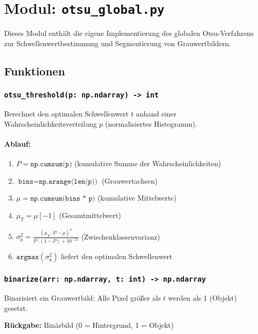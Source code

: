 \documentclass[a4paper,12pt]{article}
\begin{document}
\section{Modul: \texttt{otsu\_global.py}}

Dieses Modul enthält die eigene Implementierung des globalen Otsu-Verfahrens zur Schwellenwertbestimmung und Segmentierung von Grauwertbildern.


\subsection*{Funktionen}

\subsubsection*{\texttt{otsu\_threshold(p: np.ndarray) -> int}}

Berechnet den optimalen Schwellenwert $t$ anhand einer Wahrscheinlichkeitsverteilung $p$ (normalisiertes Histogramm).

\paragraph{Ablauf:}
\begin{enumerate}
  \item $P = \texttt{np.cumsum(p)}$ \quad (kumulative Summe der Wahrscheinlichkeiten)
  \item $\texttt{bins} = \texttt{np.arange(len(p))}$ \quad (Grauwertachsen)
  \item $\mu = \texttt{np.cumsum(bins * p)}$ \quad (kumulative Mittelwerte)
  \item $\mu_T = \mu[-1]$ \quad (Gesamtmittelwert)
  \item $\sigma_b^2 = \frac{(\mu_T \cdot P - \mu)^2}{P \cdot (1 - P) + 10^{-12}}$ \quad (Zwischenklassenvarianz)
  \item $\texttt{argmax}(\sigma_b^2)$ \quad liefert den optimalen Schwellenwert
\end{enumerate}

\subsubsection*{\texttt{binarize(arr: np.ndarray, t: int) -> np.ndarray}}

Binarisiert ein Grauwertbild: Alle Pixel größer als $t$ werden als 1 (Objekt) gesetzt.

\textbf{Rückgabe:} Binärbild (0 = Hintergrund, 1 = Objekt)
\end{document}
